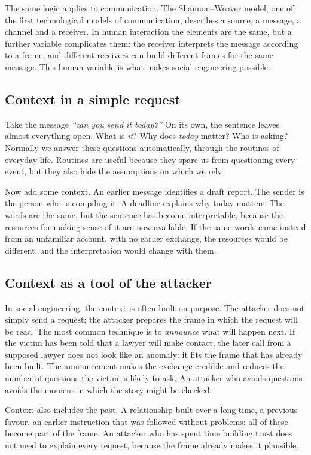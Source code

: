 The same logic applies to communication. The Shannon--Weaver model, one of the first technological models of communication, describes a source, a message, a channel and a receiver. In human interaction the elements are the same, but a further variable complicates them: the receiver interprets the message according to a frame, and different receivers can build different frames for the same message. This human variable is what makes social engineering possible.

\subsection{Context in a simple request}
Take the message \emph{``can you send it today?''} On its own, the sentence leaves almost everything open. What is \emph{it}? Why does \emph{today} matter? Who is asking? Normally we answer these questions automatically, through the routines of everyday life. Routines are useful because they spare us from questioning every event, but they also hide the assumptions on which we rely.

Now add some context. An earlier message identifies a draft report. The sender is the person who is compiling it. A deadline explains why today matters. The words are the same, but the sentence has become interpretable, because the resources for making sense of it are now available. If the same words came instead from an unfamiliar account, with no earlier exchange, the resources would be different, and the interpretation would change with them.

\subsection{Context as a tool of the attacker}
In social engineering, the context is often built on purpose. The attacker does not simply send a request; the attacker prepares the frame in which the request will be read. The most common technique is to \emph{announce} what will happen next. If the victim has been told that a lawyer will make contact, the later call from a supposed lawyer does not look like an anomaly: it fits the frame that has already been built. The announcement makes the exchange credible and reduces the number of questions the victim is likely to ask. An attacker who avoids questions avoids the moment in which the story might be checked.

Context also includes the past. A relationship built over a long time, a previous favour, an earlier instruction that was followed without problems: all of these become part of the frame. An attacker who has spent time building trust does not need to explain every request, because the frame already makes it plausible.

